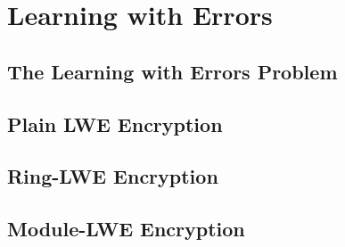 \chapter{Learning with Errors}
\label{LWE}

\section{The Learning with Errors Problem}

\section{Plain LWE Encryption}

\section{Ring-LWE Encryption}

\section{Module-LWE Encryption}
